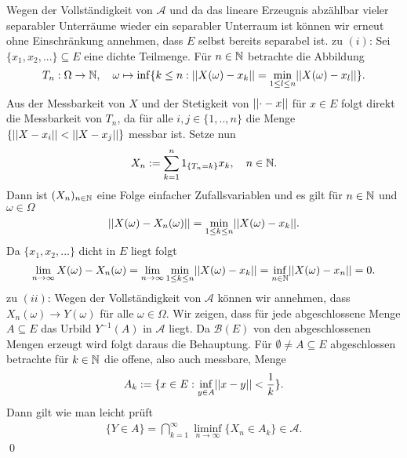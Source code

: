 \begin{proof*}
    Wegen der Vollständigkeit von $\mathcal{A}$ und da das lineare Erzeugnis abzählbar vieler separabler Unterräume wieder ein separabler Unterraum ist können wir erneut ohne Einschränkung annehmen, dass $E$ selbst bereits separabel ist.
    \newline 
    zu $(i)$:
    Sei $\{x_1,x_2,... \} \subseteq E$ eine dichte Teilmenge. Für $n \in \mathbb{N}$ betrachte die Abbildung
    $$
        T_n: \Omega \to \mathbb{N}, \quad \omega \mapsto \inf\{k \leq n: \lvert\lvert X(\omega)-x_k \rvert\rvert = \min_{1\leq l \leq n}\lvert\lvert X(\omega)-x_l \rvert\rvert\}.
    $$ 
    Aus der Messbarkeit von $X$ und der Stetigkeit von $\lvert\lvert \cdot - x \rvert\rvert$ für $x \in E$ folgt direkt die Messbarkeit von $T_n$,
    da für alle $i,j \in \{1,..,n\}$ die Menge $\{\lvert\lvert X - x_i \rvert\rvert < \lvert\lvert X - x_j \rvert\rvert\}$ messbar ist. Setze nun
    $$
        X_n := \sum_{k=1}^n 1_{\{T_n = k\}}x_k, \quad n \in \mathbb{N}.
    $$
    Dann ist $(X_n)_{n \in \mathbb{N}}$ eine Folge einfacher Zufallsvariablen und es gilt für $n \in \mathbb{N}$ und $\omega \in \Omega$
    $$
        \lvert\lvert X(\omega)-X_n(\omega) \rvert\rvert = \min_{1\leq k \leq n}\lvert\lvert X(\omega)-x_k \rvert\rvert.
    $$
    Da $\{x_1,x_2,...\}$ dicht in $E$ liegt folgt 
    $$
        \lim_{n \to \infty}{X(\omega) - X_n(\omega)} = \lim_{n \to \infty}\min_{1\leq k \leq n}\lvert\lvert X(\omega)- x_k \rvert\rvert = \inf_{n \in \mathbb{N}} \lvert\lvert X(\omega)- x_n \rvert\rvert = 0. 
    $$
    zu $(ii)$: Wegen der Vollständigkeit von $\mathcal{A}$ können wir annehmen, dass $X_n(\omega) \to Y(\omega)$ für alle $\omega \in \Omega$. 
    Wir zeigen, dass für jede abgeschlossene Menge $A \subseteq E$ das Urbild $Y^{-1}(A)$ in $\mathcal{A}$ liegt. 
    Da $\mathcal{B}(E)$ von den abgeschlossenen Mengen erzeugt wird folgt daraus die Behauptung. 
    Für $\emptyset \neq A \subseteq E$ abgeschlossen betrachte für $k \in \mathbb{N}$ die offene, also auch messbare, Menge 
    $$
        A_k := \{x \in E: \inf_{y\in A}\lvert\lvert x-y \rvert\rvert < \frac{1}{k}\}.
    $$
    Dann gilt wie man leicht prüft
    \begin{align*}
        \{Y \in A\} = \bigcap_{k=1}^{\infty}\liminf_{n \to \infty}\{X_n \in A_k\} \in \mathcal{A}.
    \end{align*}     
    \qed 
\end{proof*}


